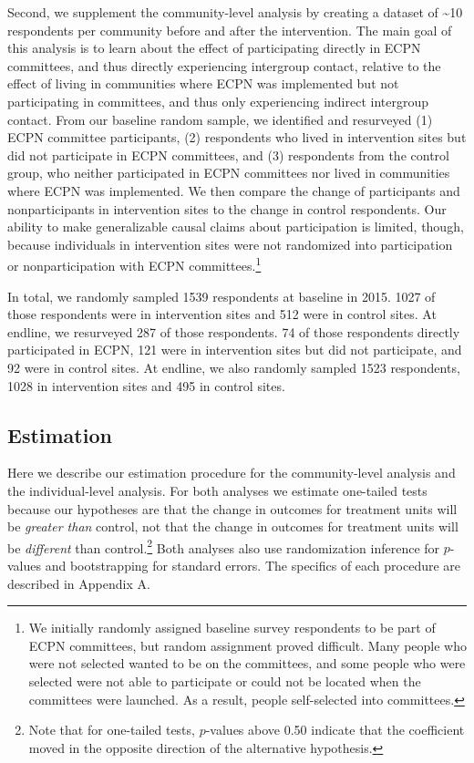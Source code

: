 \documentclass[11pt]{article}
\begin{document}
Second, we supplement the community-level analysis by creating a dataset
of \textasciitilde10 respondents per community before and after the
intervention. The main goal of this analysis is to learn about the
effect of participating directly in ECPN committees, and thus directly
experiencing intergroup contact, relative to the effect of living in
communities where ECPN was implemented but not participating in
committees, and thus only experiencing indirect intergroup contact. From
our baseline random sample, we identified and resurveyed (1) ECPN
committee participants, (2) respondents who lived in intervention sites
but did not participate in ECPN committees, and (3) respondents from the
control group, who neither participated in ECPN committees nor lived in
communities where ECPN was implemented. We then compare the change of
participants and nonparticipants in intervention sites to the change in
control respondents. Our ability to make generalizable causal claims
about participation is limited, though, because individuals in
intervention sites were not randomized into participation or
nonparticipation with ECPN committees.\footnote{We initially randomly
  assigned baseline survey respondents to be part of ECPN committees,
  but random assignment proved difficult. Many people who were not
  selected wanted to be on the committees, and some people who were
  selected were not able to participate or could not be located when the
  committees were launched. As a result, people self-selected into
  committees.}

In total, we randomly sampled 1539 respondents at baseline in 2015. 1027
of those respondents were in intervention sites and 512 were in control
sites. At endline, we resurveyed 287 of those respondents. 74 of those
respondents directly participated in ECPN, 121 were in intervention
sites but did not participate, and 92 were in control sites. At endline,
we also randomly sampled 1523 respondents, 1028 in intervention sites
and 495 in control sites.

\hypertarget{estimation}{%
\subsection{Estimation}\label{estimation}}

Here we describe our estimation procedure for the community-level
analysis and the individual-level analysis. For both analyses we
estimate one-tailed tests because our hypotheses are that the change in
outcomes for treatment units will be \emph{greater than} control, not
that the change in outcomes for treatment units will be \emph{different}
than control.\footnote{Note that for one-tailed tests, \(p\)-values
  above 0.50 indicate that the coefficient moved in the opposite
  direction of the alternative hypothesis.} Both analyses also use
randomization inference for \(p\)-values and bootstrapping for standard
errors. The specifics of each procedure are described in Appendix A.
\end{document}

